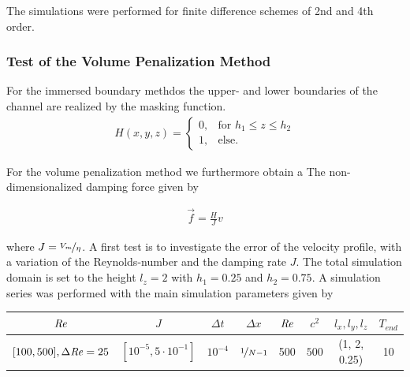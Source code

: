The simulations were performed for finite difference schemes of 2nd and 4th order.

\subsubsection{Test of the Volume Penalization Method}


For the immersed boundary methdos the upper- and lower boundaries of the channel are realized by the masking function.
\begin{align}
H(x, y, z) = \begin{cases}
                    0, & \text{for \  }  h_1 \leq z \leq h_2 \\
                    1, & \text{else}.
             \end{cases}
\end{align}

For the volume penalization method we furthermore obtain a
The non-dimensionalized damping force  given by

\begin{align}
    \vec{f} = \frac{H}{J}v
\end{align}

where $J = \nicefrac{V_{m}}{\eta}$.
A first test is to investigate the error of the velocity profile, with a variation of the Reynolds-number and the damping rate $J$.
The total simulation domain is set to the height $l_z=2$ with $h_1=0.25$ and $h_2=0.75$.
A simulation series was performed with the main simulation parameters given by


\begin{center}
\vspace*{0.7ex}
\begin{tabular}{c|c|c|c|c|c|c|c }
 $ \mbox{\textit{Re}}  $                      & $J$ &  $\Delta t$ & $\Delta x$            & $\mbox{\textit{Re}}$  & $c^2$   & $l_x, l_y, l_z$ & $T_{end}$\\
\hline
 $[100, 500], \Delta \mbox{\textit{Re}} = 25 $& $[10^{-5}, 5\cdot10^{-1}]  $ &  $10^{-4}$ & $\nicefrac{1}{N - 1}$ & 500     & $500$   & (1, 2, 0.25)  & 10\\
\end{tabular}
\vspace*{0.7ex}
\end{center}


